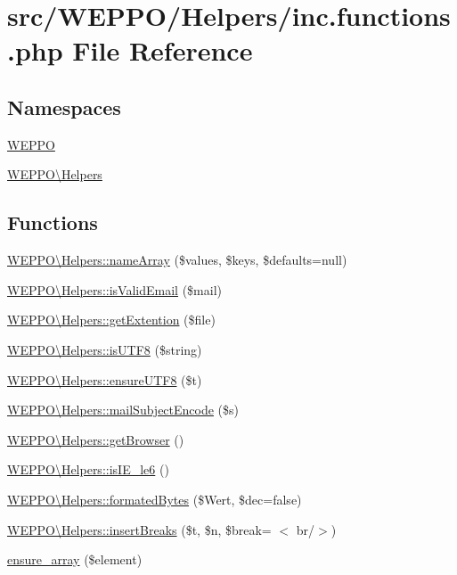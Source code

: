 \hypertarget{inc_8functions_8php}{}\section{src/\+W\+E\+P\+P\+O/\+Helpers/inc.functions.\+php File Reference}
\label{inc_8functions_8php}
\subsection*{Namespaces}
\begin{DoxyCompactItemize}
\item 
 \hyperlink{namespaceWEPPO}{W\+E\+P\+PO}
\item 
 \hyperlink{namespaceWEPPO_1_1Helpers}{W\+E\+P\+P\+O\textbackslash{}\+Helpers}
\end{DoxyCompactItemize}
\subsection*{Functions}
\begin{DoxyCompactItemize}
\item 
\hyperlink{namespaceWEPPO_1_1Helpers_a74b2707f3efbcfd966872e605458ff96}{W\+E\+P\+P\+O\textbackslash{}\+Helpers\+::name\+Array} (\$values, \$keys, \$defaults=null)
\item 
\hyperlink{namespaceWEPPO_1_1Helpers_a8f09da65a77ba4732e5cc4087f5b6310}{W\+E\+P\+P\+O\textbackslash{}\+Helpers\+::is\+Valid\+Email} (\$mail)
\item 
\hyperlink{namespaceWEPPO_1_1Helpers_a891ecb1686a8bcca73bd18b5adeb6112}{W\+E\+P\+P\+O\textbackslash{}\+Helpers\+::get\+Extention} (\$file)
\item 
\hyperlink{namespaceWEPPO_1_1Helpers_add9a10540194b2592cabffda29e10d6e}{W\+E\+P\+P\+O\textbackslash{}\+Helpers\+::is\+U\+T\+F8} (\$string)
\item 
\hyperlink{namespaceWEPPO_1_1Helpers_a7aba6be7d2fd50163e778914dfcb6176}{W\+E\+P\+P\+O\textbackslash{}\+Helpers\+::ensure\+U\+T\+F8} (\$t)
\item 
\hyperlink{namespaceWEPPO_1_1Helpers_a9518f7e4142ca1ab4903c96a57a663fb}{W\+E\+P\+P\+O\textbackslash{}\+Helpers\+::mail\+Subject\+Encode} (\$s)
\item 
\hyperlink{namespaceWEPPO_1_1Helpers_a9719eff55311d90c76062e465fd86f47}{W\+E\+P\+P\+O\textbackslash{}\+Helpers\+::get\+Browser} ()
\item 
\hyperlink{namespaceWEPPO_1_1Helpers_ad88c8357abb00c4c69823295f108a9c0}{W\+E\+P\+P\+O\textbackslash{}\+Helpers\+::is\+I\+E\+\_\+le6} ()
\item 
\hyperlink{namespaceWEPPO_1_1Helpers_ac35584046e823ceda19ca5aea4e861d0}{W\+E\+P\+P\+O\textbackslash{}\+Helpers\+::formated\+Bytes} (\$Wert, \$dec=false)
\item 
\hyperlink{namespaceWEPPO_1_1Helpers_a695175f776034e529fcd7592c408412b}{W\+E\+P\+P\+O\textbackslash{}\+Helpers\+::insert\+Breaks} (\$t, \$n, \$break= \textquotesingle{}$<$ br/$>$\textquotesingle{})
\item 
\hyperlink{inc_8functions_8php_ae14b2473cd16aff93038d083e81aa989}{ensure\+\_\+array} (\$element)
\end{DoxyCompactItemize}


